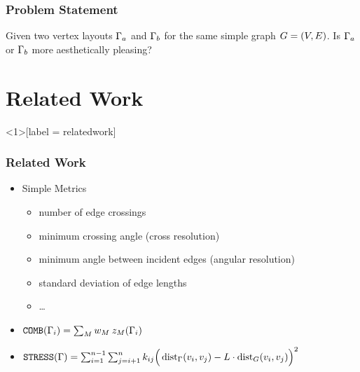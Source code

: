 \documentclass{beamer}
\begin{document}
\begin{frame}
  \frametitle{Problem Statement}
  Given two \alert<2>{vertex layouts} \(\Gamma_a\) and \(\Gamma_b\) for the same \alert<3>{simple graph}
  \(G=(V,E)\).\newline
  Is \(\Gamma_a\) or \(\Gamma_b\) more aesthetically pleasing?
  \par\vspace{1pc}
\end{frame}

\section{Related Work}

\begin{frame}<1>[label = relatedwork]
  \frametitle{Related Work}
  \begin{itemize}
  \item<+-> Simple Metrics
    \begin{itemize}
    \item number of edge crossings
    \item minimum crossing angle (cross resolution)
    \item minimum angle between incident edges (angular resolution)
    \item standard deviation of edge lengths
    \item\dots
    \end{itemize}
    \bigskip
  \item<+-> %
    \( \mbox{\text{\upshape\ttfamily COMB}}(\Gamma_i) = \sum_{M} w_M \: z_{M}(\Gamma_i) \)
    \bigskip
  \item<+-> %
    \(
      \operatorname{\mbox{\text{\upshape\ttfamily STRESS}}}(\Gamma) = \sum_{i=1}^{n-1} \sum_{j=i+1}^{n} k_{ij}
      \Big( \operatorname{dist}_\Gamma(v_i,v_j) - L \cdot \operatorname{dist}_G(v_i,v_j) \Big)^2
    \)
  \end{itemize}
\end{frame}
\end{document}
